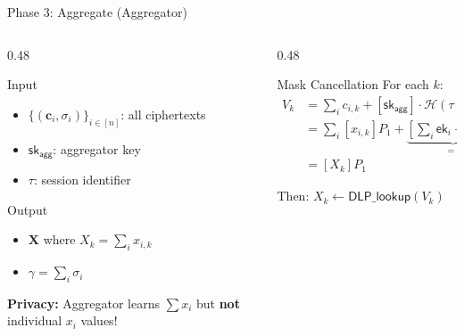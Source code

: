 \documentclass[aspectratio=169,10pt]{beamer}
\newcommand{\Hash}{\mathcal{H}}
\begin{document}
\begin{frame}{Phase 3: Aggregate (Aggregator)}
    \begin{columns}[T]
        \begin{column}{0.48\textwidth}
            \begin{alertblock}{Input}
                \begin{itemize}
                    \item $\{(\mathbf{c}_i, \sigma_i)\}_{i \in [n]}$: all ciphertexts
                    \item $\mathsf{sk}_{\mathsf{agg}}$: aggregator key
                    \item $\tau$: session identifier
                \end{itemize}
            \end{alertblock}

            \begin{exampleblock}{Output}
                \begin{itemize}
                    \item $\mathbf{X}$ where $X_k = \sum_i x_{i,k}$
                    \item $\gamma = \sum_i \sigma_i$
                \end{itemize}
            \end{exampleblock}

            \vspace{0.2em}
            \textbf{Privacy:} Aggregator learns $\sum x_i$ but \textbf{not} individual $x_i$ values!
        \end{column}
        \begin{column}{0.48\textwidth}
            \begin{block}{Mask Cancellation}
                For each $k$:
                \begin{align*}
                    V_k &= \sum_{i} c_{i,k} + [\mathsf{sk}_{\mathsf{agg}}] \cdot \Hash(\tau \| k)\\[0.3em]
                    &= \sum_i [x_{i,k}]P_1 + \underbrace{[\sum_i \mathsf{ek}_i + \mathsf{sk}_{\mathsf{agg}}]}_{= 0} \cdot \Hash\\[0.3em]
                    &= [X_k] P_1
                \end{align*}
            \end{block}

            Then: $X_k \gets \mathsf{DLP\_lookup}(V_k)$
        \end{column}
    \end{columns}
\end{frame}
\end{document}
